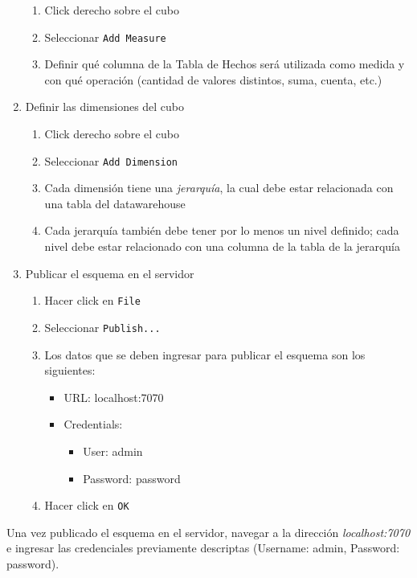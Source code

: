 \begin{enumerate}
    \begin{enumerate}
        \item Click derecho sobre el cubo
        \item Seleccionar \texttt{Add Measure}
        \item Definir qué columna de la Tabla de Hechos será utilizada como medida y con qué operación (cantidad de valores distintos, suma, cuenta, etc.)
    \end{enumerate}
    \item Definir las dimensiones del cubo
    \begin{enumerate}
        \item Click derecho sobre el cubo
        \item Seleccionar \texttt{Add Dimension}
        \item Cada dimensión tiene una \emph{jerarquía}, la cual debe estar relacionada con una tabla del datawarehouse 
        \item Cada jerarquía también debe tener por lo menos un nivel definido; cada nivel debe estar relacionado con una columna de la tabla de la jerarquía
    \end{enumerate}
    \item Publicar el esquema en el servidor
    \begin{enumerate}
        \item Hacer click en \texttt{File}
        \item Seleccionar \texttt{Publish...}
        \item Los datos que se deben ingresar para publicar el esquema son los siguientes:
        \begin{itemize}
            \item URL: localhost:7070
            \item Credentials:
                \begin{itemize}
                    \item User: admin
                    \item Password: password
                \end{itemize}
        \end{itemize}
        \item Hacer click en \texttt{OK}
    \end{enumerate}
\end{enumerate}

Una vez publicado el esquema en el servidor, navegar a la dirección \emph{localhost:7070} e ingresar las credenciales previamente descriptas (Username: admin, Password: password). 

